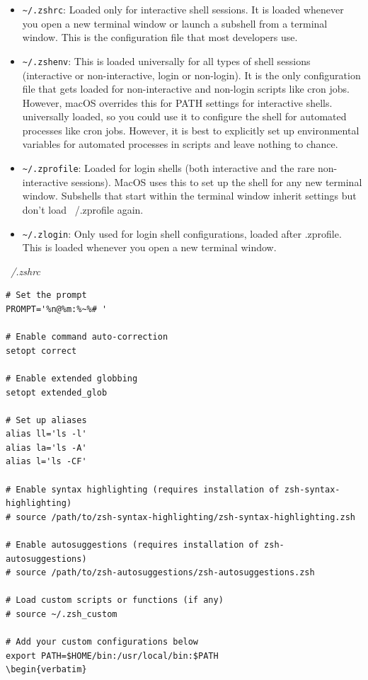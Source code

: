 \documentclass{article}
\newenvironment{codetemplate}[1][]{%
  \mybasecolorbox[#1]
  \itshape
}{%
  \endmybasecolorbox
}
\begin{document}
\begin{itemize}
    \item \verb|~/.zshrc|: Loaded only for interactive shell sessions. It is loaded whenever you open a new terminal window or launch a subshell from a terminal window. This is the configuration file that most developers use.
    \item \verb|~/.zshenv|: This is loaded universally for all types of shell sessions (interactive or non-interactive, login or non-login). It is the only configuration file that gets loaded for non-interactive and non-login scripts like cron jobs. However, macOS overrides this for PATH settings for interactive shells. universally loaded, so you could use it to configure the shell for automated processes like cron jobs. However, it is best to explicitly set up environmental variables for automated processes in scripts and leave nothing to chance.
    \item \verb|~/.zprofile|: Loaded for login shells (both interactive and the rare non-interactive sessions). MacOS uses this to set up the shell for any new terminal window. Subshells that start within the terminal window inherit settings but don't load ~/.zprofile again.
    \item \verb|~/.zlogin|: Only used for login shell configurations, loaded after .zprofile. This is loaded whenever you open a new terminal window.
\end{itemize}
\begin{codetemplate}{~/.zshrc}
\begin{verbatim}
# Set the prompt
PROMPT='%n@%m:%~%# '

# Enable command auto-correction
setopt correct

# Enable extended globbing
setopt extended_glob

# Set up aliases
alias ll='ls -l'
alias la='ls -A'
alias l='ls -CF'

# Enable syntax highlighting (requires installation of zsh-syntax-highlighting)
# source /path/to/zsh-syntax-highlighting/zsh-syntax-highlighting.zsh

# Enable autosuggestions (requires installation of zsh-autosuggestions)
# source /path/to/zsh-autosuggestions/zsh-autosuggestions.zsh

# Load custom scripts or functions (if any)
# source ~/.zsh_custom

# Add your custom configurations below
export PATH=$HOME/bin:/usr/local/bin:$PATH    
\begin{verbatim}

\end{verbatim}
\end{codetemplate}
\end{document}
